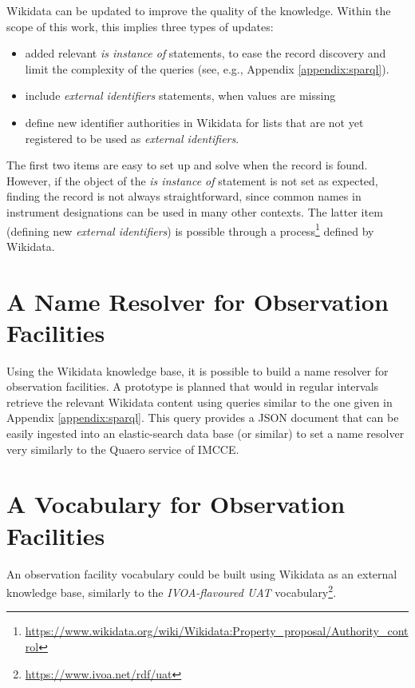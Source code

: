 \documentclass[11pt,a4paper]{ivoa}
\begin{document}
Wikidata can be updated to improve the quality of the knowledge.
Within the scope of this work, this implies three types of updates:
\begin{itemize}
\item added relevant \emph{is instance of} statements, to ease the
record discovery and limit the complexity of the queries (see, e.g.,
Appendix \ref{appendix:sparql}).
\item include \emph{external identifiers} statements, when values
are missing
\item define new identifier authorities in Wikidata for lists that
are not yet registered to be used as \emph{external identifiers}.
\end{itemize}
The first two items are easy to set up and solve when the record is
found. However, if the object of the \emph{is instance of} statement is
not set as expected, finding the record is not always
straightforward, since common names in instrument designations
can be used in many other contexts.
The latter item (defining new \emph{external identifiers}) is
possible through a process\footnote{\url{https://www.wikidata.org/wiki/Wikidata:Property_proposal/Authority_control}}
defined by Wikidata.

\section{A Name Resolver for Observation Facilities}
Using the Wikidata knowledge base, it is possible to build a name
resolver for observation facilities. A prototype is planned that would
in regular intervals retrieve the relevant
Wikidata content using queries similar to the one
given in Appendix \ref{appendix:sparql}. This query provides
a JSON document that can be easily ingested into an elastic-search
data base (or similar) to set a name resolver very similarly to
the Quaero service of IMCCE.

\section{A Vocabulary for Observation Facilities}
An observation facility vocabulary could be built using Wikidata
as an external knowledge base, similarly to the \emph{IVOA-flavoured
UAT} vocabulary\footnote{\url{https://www.ivoa.net/rdf/uat}}.
\end{document}
